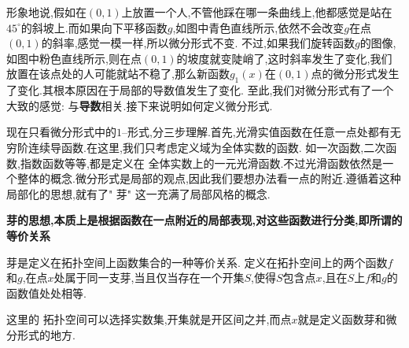 形象地说,假如在$(0,1)$上放置一个人,不管他踩在哪一条曲线上,他都感觉是站在$45^\circ$的斜坡上.而如果向下平移函数$g$,如图中青色直线所示,依然不会改变$g$在点$(0,1)$的斜率,感觉一模一样,所以微分形式不变.
不过,如果我们旋转函数$g$的图像,如图中粉色直线所示,则在点$(0,1)$的坡度就变陡峭了,这时斜率发生了变化,我们放置在该点处的人可能就站不稳了,那么新函数$g_1(x)$在$(0,1)$点的微分形式发生了变化.其根本原因在于局部的导数值发生了变化.
至此,我们对微分形式有了一个大致的感觉: 与\textbf{导数}相关.接下来说明如何定义微分形式.
\begin{center}
\end{center}
现在只看微分形式中的$1$--形式,分三步理解.首先,光滑实值函数在任意一点处都有无穷阶连续导函数.在这里,我们只考虑定义域为全体实数的函数. 如一次函数,二次函数,指数函数等等,都是定义在
全体实数上的一元光滑函数.不过光滑函数依然是一个整体的概念.微分形式是局部的观点,因此我们要想办法看一点的附近.遵循着这种局部化的思想,就有了" 芽"
这一充满了局部风格的概念.

\textbf{芽的思想,本质上是根据函数在一点附近的局部表现,对这些函数进行分类,即所谓的等价关系}
\begin{definition}[芽]\label{def:芽}
    芽是定义在拓扑空间上函数集合的一种等价关系.
    定义在拓扑空间上的两个函数$f$和$g$,在点$x$处属于同一支芽,当且仅当存在一个开集$S$,使得$S$包含点$x$,且在$S$上$f$和$g$的函数值处处相等.
\end{definition}
这里的 拓扑空间可以选择实数集,开集就是开区间之并,而点$x$就是定义函数芽和微分形式的地方.
